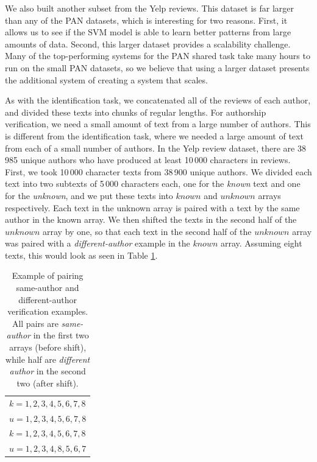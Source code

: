 We also built another subset from the Yelp reviews. This dataset is far larger than any of the PAN datasets, which is interesting for two reasons. First, it allows us to see if the SVM model is able to learn better patterns from large amounts of data. Second, this larger dataset provides a scalability challenge. Many of the top-performing systems for the PAN shared task take many hours to run on the small PAN datasets, so we believe that using a larger dataset presents the additional system of creating a system that scales.

As with the identification task, we concatenated all of the reviews of each author, and divided these texts into chunks of regular lengths.
For authorship verification, we need a small amount of text from a large number of authors. This is different from the identification task, where we needed a large amount of text from each of a small number of authors. In the Yelp review dataset, there are 38\,985 unique authors who have produced at least 10\,000 characters in reviews.  First, we took 10\,000 character texts from 38\,900 unique authors. We divided each text into two subtexts of 5\,000 characters each, one for the \textit{known} text and one for the \textit{unknown}, and we put these texts into $known$ and $unknown$ arrays respectively. Each text in the unknown array is paired with a text by the same author in the known array. We then shifted the texts in the second half of the $unknown$ array by one, so that each text in the second half of the $unknown$ array was paired with a \textit{different-author} example in the $known$ array. Assuming eight texts, this would look as seen in Table \ref{ver-table}.

\begin{table}[ht]
\caption{\label{ver-table}Example of pairing same-author and different-author verification examples. All pairs are \textit{same-author} in the first two arrays (before shift), while half are \textit{different author} in the second two (after shift).}
\begin{center}
\begin{tabular}{l}
\toprule
$k = {1, 2, 3, 4, 5, 6, 7, 8}$\\
$u = {1, 2, 3, 4, 5, 6, 7, 8}$\\
\midrule
$k = {1, 2, 3, 4, 5, 6, 7, 8}$\\
$u = {1, 2, 3, 4, 8, 5, 6, 7}$\\
\bottomrule
\end{tabular}
\end{center}
\end{table}

